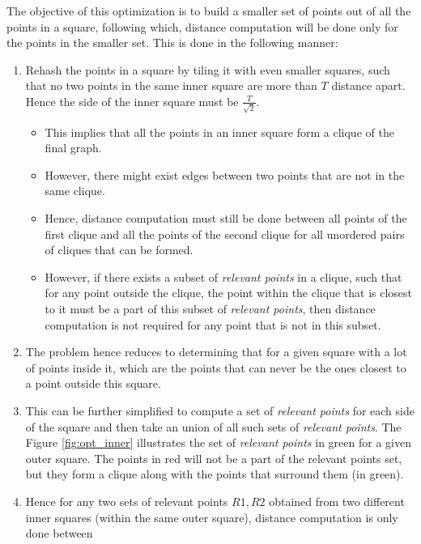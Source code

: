 The objective of this optimization is to build a smaller set of points out of all the points in a square, following which, distance computation will be done only for the points in the smaller set. This is done in the following manner:
\begin{enumerate}
        \item Rehash the points in a square by tiling it with even smaller squares, such that no two points in the same inner square are more than \begin{math} T \end{math} distance apart. Hence the side of the inner square must be \begin{math} \frac{T}{\sqrt2} \end{math}.
            \begin{itemize}
            \item This implies that all the points in an inner square form a clique of the final graph.
            \item However, there might exist edges between two points that are not in the same clique.
            \item Hence, distance computation must still be done between all points of the first clique and all the points of the second clique for all unordered pairs of cliques that can be formed.
            \item However, if there exists a subset of \emph{relevant points} in a clique, such that for any point outside the clique, the point within the clique that is closest to it must be a part of this subset of \emph{relevant points}, then distance computation is not required for any point that is not in this subset.
            \end{itemize}
        \item The problem hence reduces to determining that for a given square with a lot of points inside it, which are the points that can never be the ones closest to a point outside this square.
        \item This can be further simplified to compute a set of \emph{relevant points} for each side of the square and then take an union of all such sets of \emph{relevant points}. The Figure \ref{fig:opt_inner} illustrates the set of \emph{relevant points} in green for a given outer square. The points in red will not be a part of the relevant points set, but they form a clique along with the points that surround them (in green).
        \item Hence for any two sets of relevant points \begin{math} R1, R2 \end{math} obtained from two different inner squares (within the same outer square), distance computation is only done between %
\end{enumerate}
